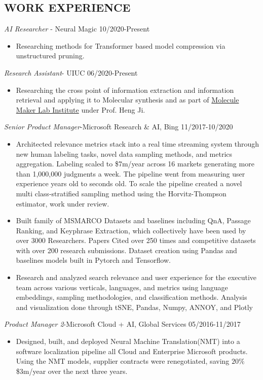 \documentclass[line,margin]{res}
\begin{document}
\begin{resume}
\section{WORK EXPERIENCE}
{\sl AI Researcher} - Neural Magic \hfill 10/2020-Present
\begin{itemize}  \itemsep -4pt 
\item Researching methods for Transformer based model compression via unstructured pruning.
\end{itemize}
{\sl Research Assistant}- UIUC \hfill 06/2020-Present
\begin{itemize}  \itemsep -4pt 
\item Researching the cross point of information extraction and information retrieval and applying it to Molecular synthesis and as part of \href{https://moleculemaker.org/}{Molecule Maker Lab Institute} under Prof. Heng Ji. 
\end{itemize}
{\sl Senior Product Manager}-Microsoft Research \& AI,  Bing  \hfill 11/2017-10/2020
\begin{itemize}  \itemsep -4pt 
\item Architected relevance metrics stack into a real time streaming system through new human labeling tasks, novel data sampling methods, and metrics aggregation. Labeling scaled to \$7m/year across 16 markets generating more than 1,000,000 judgments a week. The pipeline went from measuring user experience years old to seconds old. To scale the pipeline created a novel multi class-stratified sampling method using the Horvitz-Thompson estimator, work under review.
\item  Built family of MSMARCO Datasets and baselines including QnA, Passage Ranking, and Keyphrase Extraction, which collectively have been used by over 3000 Researchers. Papers Cited over 250 times and competitive datasets with over 200 research submissions. Dataset creation using Pandas and baselines models built in Pytorch and Tensorflow.
\item Research and analyzed search relevance and user experience for the executive team across various verticals, languages, and metrics using language embeddings, sampling methodologies, and classification methods. Analysis and visualization done through tSNE, Pandas, Numpy, ANNOY, and Plotly
\end{itemize}
{\sl Product Manager 2}-Microsoft Cloud + AI, Global Services \hfill 05/2016-11/2017
\begin{itemize}  \itemsep -4pt
\item Designed, built, and deployed Neural Machine Translation(NMT) into a software localization pipeline all Cloud and Enterprise Microsoft products. Using the NMT models, supplier contracts were renegotiated, saving $20\%$  \$3m/year over the next three years.

\end{itemize}
\end{resume}
\end{document}
